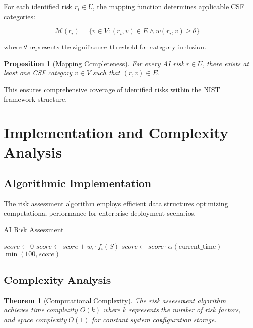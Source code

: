 \documentclass[11pt,letterpaper]{article}
\newtheorem{theorem}{Theorem}
\newtheorem{proposition}{Proposition}
\begin{document}
For each identified risk $r_i \in U$, the mapping function determines applicable CSF categories:

\begin{equation}
\mathscr{M}(r_i) = \{v \in V : (r_i, v) \in E \land w(r_i, v) \geq \theta\}
\end{equation}

where $\theta$ represents the significance threshold for category inclusion.

\begin{proposition}[Mapping Completeness]
For every AI risk $r \in U$, there exists at least one CSF category $v \in V$ such that $(r, v) \in E$.
\end{proposition}

This ensures comprehensive coverage of identified risks within the NIST framework structure.

\section{Implementation and Complexity Analysis}

\subsection{Algorithmic Implementation}

The risk assessment algorithm employs efficient data structures optimizing computational performance for enterprise deployment scenarios.

\begin{algorithm}
\caption{AI Risk Assessment}
\begin{algorithmic}[1]
    \State $score \leftarrow 0$
        \State $score \leftarrow score + w_i \cdot f_i(S)$
    \EndFor
    \State $score \leftarrow score \cdot \alpha(\text{current\_time})$
    \State \Return $\min(100, score)$
\EndProcedure
\end{algorithmic}
\end{algorithm}

\subsection{Complexity Analysis}

\begin{theorem}[Computational Complexity]
The risk assessment algorithm achieves time complexity $O(k)$ where $k$ represents the number of risk factors, and space complexity $O(1)$ for constant system configuration storage.
\end{theorem}
\end{document}
